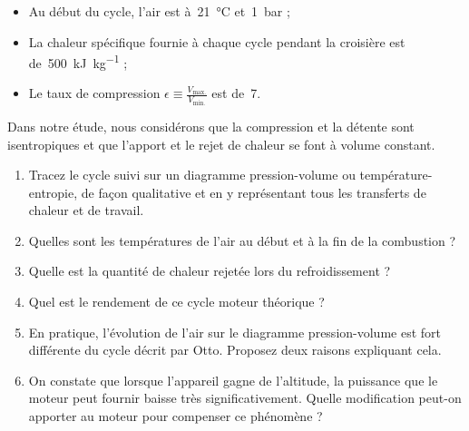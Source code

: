 \begin{figure}
\begin{center}
		\end{center}
		\label{fig_photos_moteur_essence}
	\end{figure}
	
	\begin{itemize}
		\item Au début du cycle, l’air est à~\SI{21}{\degreeCelsius} et~\SI{1}{\bar} ;
		\item La chaleur spécifique fournie à chaque cycle pendant la croisière est de~\SI{500}{\kilo\joule\per\kilogram} ;
		\item Le taux de compression $\epsilon \equiv \frac{V_\text{max.}}{V_\text{min.}}$ est de~\num{7}.
	\end{itemize}

	Dans notre étude, nous considérons que la compression et la détente sont isentropiques et que l’apport et le rejet de chaleur se font à volume constant.

	\begin{enumerate}
		\item Tracez le cycle suivi sur un diagramme pression-volume ou température-entropie, de façon qualitative et en y représentant tous les transferts de chaleur et de travail.
		\item Quelles sont les températures de l’air au début et à la fin de la combustion ?
		\item Quelle est la quantité de chaleur rejetée lors du refroidissement ?
		\item Quel est le rendement de ce cycle moteur théorique ?
		\item En pratique, l’évolution de l’air sur le diagramme pression-volume est fort différente du cycle décrit par Otto. Proposez deux raisons expliquant cela.
		\item On constate que lorsque l’appareil gagne de l’altitude, la puissance que le moteur peut fournir baisse très significativement. Quelle modification peut-on apporter au moteur pour compenser ce phénomène ?
	\end{enumerate}


